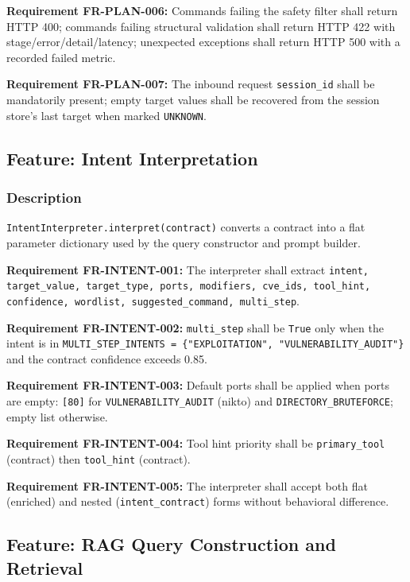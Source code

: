 \documentclass[10pt,journal,onecolumn]{IEEEtran}
\newcommand{\reqid}[1]{\textbf{#1}}
\begin{document}
\reqid{Requirement FR-PLAN-006:} Commands failing the safety filter shall return HTTP 400; commands failing structural validation shall return HTTP 422 with stage/error/detail/latency; unexpected exceptions shall return HTTP 500 with a recorded failed metric.

\reqid{Requirement FR-PLAN-007:} The inbound request \texttt{session\_id} shall be mandatorily present; empty target values shall be recovered from the session store's last target when marked \texttt{UNKNOWN}.

\subsection{Feature: Intent Interpretation}

\subsubsection{Description}

\texttt{IntentInterpreter.\allowbreak interpret(contract)} converts a contract into a flat parameter dictionary used by the query constructor and prompt builder.

\reqid{Requirement FR-INTENT-001:} The interpreter shall extract \texttt{intent, target\_\allowbreak value, target\_\allowbreak type, ports, modifiers, cve\_\allowbreak ids, tool\_\allowbreak hint, confidence, wordlist, suggested\_\allowbreak command, multi\_\allowbreak step}.

\reqid{Requirement FR-INTENT-002:} \texttt{multi\_step} shall be \texttt{True} only when the intent is in \texttt{MULTI\_\allowbreak STEP\_\allowbreak INTENTS = \{"EXPLOITATION", "VULNERABILITY\_\allowbreak AUDIT"\}} and the contract confidence exceeds 0.85.

\reqid{Requirement FR-INTENT-003:} Default ports shall be applied when ports are empty: \texttt{[80]} for \texttt{VULNERABILITY\_AUDIT} (nikto) and \texttt{DIRECTORY\_BRUTEFORCE}; empty list otherwise.

\reqid{Requirement FR-INTENT-004:} Tool hint priority shall be \texttt{primary\_tool} (contract) then \texttt{tool\_hint} (contract).

\reqid{Requirement FR-INTENT-005:} The interpreter shall accept both flat (enriched) and nested (\texttt{intent\_contract}) forms without behavioral difference.

\subsection{Feature: RAG Query Construction and Retrieval}
\end{document}
